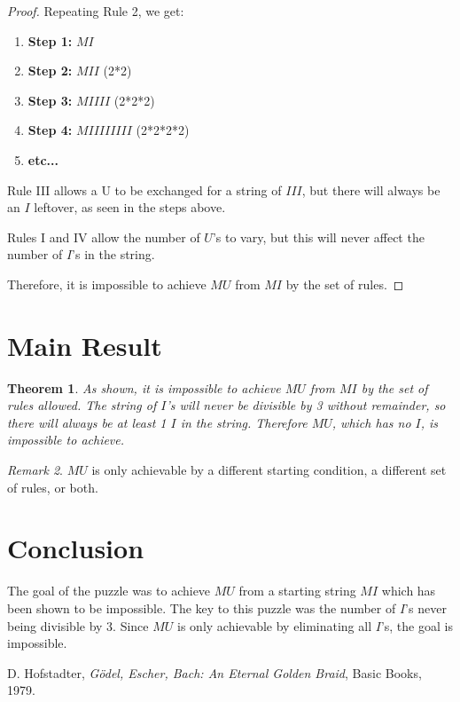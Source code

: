 \documentclass{article}
\theoremstyle{plain}
\newtheorem{theorem}{Theorem}[section]
\theoremstyle{definition}
\theoremstyle{remark}
\newtheorem{remark}[theorem]{Remark}
\begin{document}
\begin{proof}
Repeating Rule 2, we get:

\begin{enumerate}
  \item \textbf{Step 1:} $MI$
  \item \textbf{Step 2:} $MII$ (2*2)
  \item \textbf{Step 3:} $MIIII$ (2*2*2)
  \item \textbf{Step 4:} $MIIIIIIII$ (2*2*2*2)
  \item \textbf{etc...}
\end{enumerate}

Rule III allows a U to be exchanged for a string of $III$, but there will always be an $I$ leftover, as seen in the steps above.

Rules I and IV allow the number of $U$'s to vary, but this will never affect the number of $I$'s in the string.

Therefore, it is impossible to achieve $MU$ from $MI$ by the set of rules.

  
\end{proof}

\section{Main Result}
\begin{theorem}
As shown, it is impossible to achieve $MU$ from $MI$ by the set of rules allowed. The string of $I$'s will never be divisible by 3 without remainder, so there will always be at least 1 $I$ in the string. Therefore $MU$, which has no $I$, is impossible to achieve.
\end{theorem}

\begin{remark}
$MU$ is only achievable by a different starting condition, a different set of rules, or both.
\end{remark}

\section{Conclusion}
The goal of the puzzle was to achieve $MU$ from a starting string $MI$ which has been shown to be impossible. The key to this puzzle was the number of $I$'s never being divisible by 3. Since $MU$ is only achievable by eliminating all $I$'s, the goal is impossible.

\begin{thebibliography}{99}
 D. Hofstadter, \textit{Gödel, Escher, Bach: An Eternal Golden Braid}, Basic Books, 1979.
\end{thebibliography}
\end{document}

